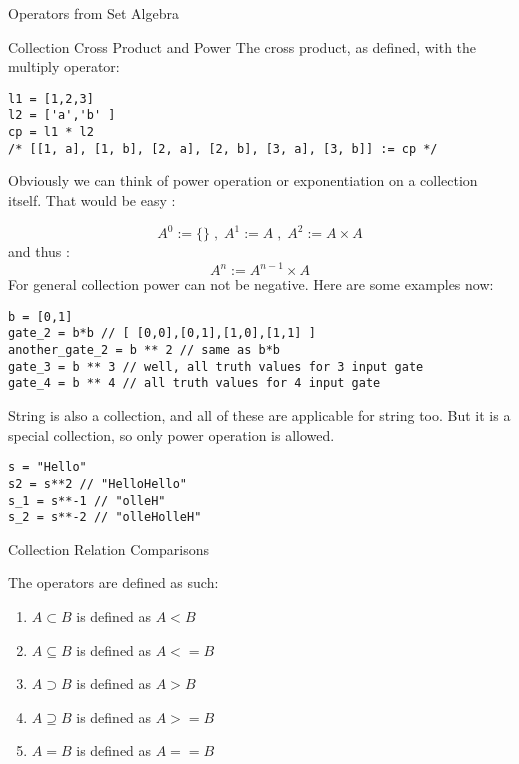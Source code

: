 \begin{section}{Operators from Set Algebra}
\begin{subsection}{Collection Cross Product and Power}
The cross product, as defined, with the multiply operator:

\begin{center}\begin{minipage}{\linewidth}
\begin{lstlisting}[style=JexlStyle]
l1 = [1,2,3]
l2 = ['a','b' ]
cp = l1 * l2 
/* [[1, a], [1, b], [2, a], [2, b], [3, a], [3, b]] := cp */
\end{lstlisting}
\end{minipage}\end{center}

Obviously we can think of power operation or exponentiation 
on a collection itself. That would be easy :

$$
A^0 := \{\} \; , \; A^1 := A \; , \; A^2 := A \times A
$$
and thus :
$$
A^n :=  A^{n-1} \times A
$$
For general collection power can not be negative.
Here are some examples now:

\begin{lstlisting}[style=JexlStyle]
b = [0,1]
gate_2 = b*b // [ [0,0],[0,1],[1,0],[1,1] ]
another_gate_2 = b ** 2 // same as b*b 
gate_3 = b ** 3 // well, all truth values for 3 input gate 
gate_4 = b ** 4 // all truth values for 4 input gate 
\end{lstlisting}

String is also a collection, and all of these are applicable for string too.
But it is a special collection, so only power operation is allowed.

\begin{lstlisting}[style=JexlStyle]
s = "Hello"
s2 = s**2 // "HelloHello"
s_1 = s**-1 // "olleH"
s_2 = s**-2 // "olleHolleH"
\end{lstlisting}
\end{subsection}

\begin{subsection}{Collection Relation Comparisons}

The operators are defined as such:
\begin{enumerate}
\item{ $A \subset B $ is defined as $A < B $  }
\item{ $A \subseteq B $ is defined as $A <= B $  }
\item{ $A \supset B $ is defined as $A > B $  }
\item{ $A \supseteq B $ is defined as $A >= B $  }
\item{ $A = B$ is defined as $A == B$  }
\end{enumerate}


\end{subsection}
\end{section}
